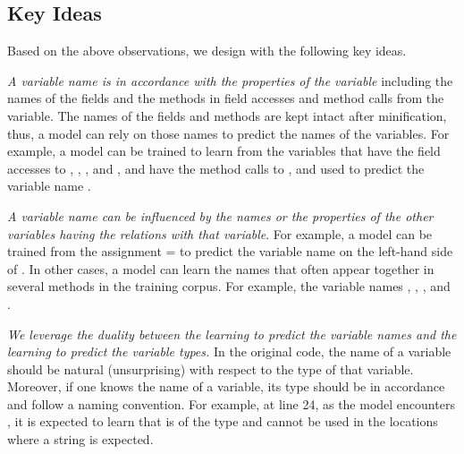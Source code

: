 \subsection{Key Ideas}
\label{key:sec}

Based on the above observations, we design {\tool} with the following
key ideas.





 {\em A variable name is in accordance with
  the properties of the variable} including the names of the fields
and the methods in field accesses and method calls from the variable.
The names of the fields and methods are kept intact after
minification, thus, a model can rely on those names to predict the
names of the variables. For example, a model can be trained to learn
from the variables that have the field accesses to
, , , and
, and have the method calls to ,
and used to predict the variable name .

 {\em A variable name can be influenced by
  the names or the properties of the other variables having the
  relations with that variable}. For example, a model can be trained
from the assignment  =
 to predict the variable name on the
left-hand side of . In other cases, a
model can learn the names that often appear together in several
methods in the training corpus. For example, the variable names
, , , and
.

 {\em We leverage the duality between the
  learning to predict the variable names and the learning to predict
  the variable types.} In the original code, the name of a variable
should be natural (unsurprising) with respect to the type of that
variable. Moreover, if one knows the name of a variable, its type
should be in accordance and follow a naming convention.  For example,
at line 24, as the model encounters , it is expected
to learn that  is of the type  and cannot be used in
the locations where a string is expected.
